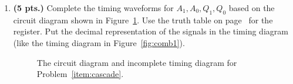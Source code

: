 \begin{enumerate}
\begin{solution} {
\begin{figure}[ht]
\end{figure}
} \end{solution}


\item{\bf (5 pts.)} Complete the timing waveforms for $A_1, A_0, Q_1, Q_0$
\label{item:cascade}
based on the circuit diagram shown in Figure~\ref{fig:cascade}.  Use the truth 
table on page~\pageref{page:reg} for the register. Put the decimal 
representation of the signals in the timing diagram (like the timing 
diagram in Figure~\ref{fig:comb1}).
\begin{figure}[ht]
\caption{The circuit diagram and incomplete timing diagram for 
Problem~\ref{item:cascade}.}
\label{fig:cascade}
\end{figure}


\end{enumerate}
